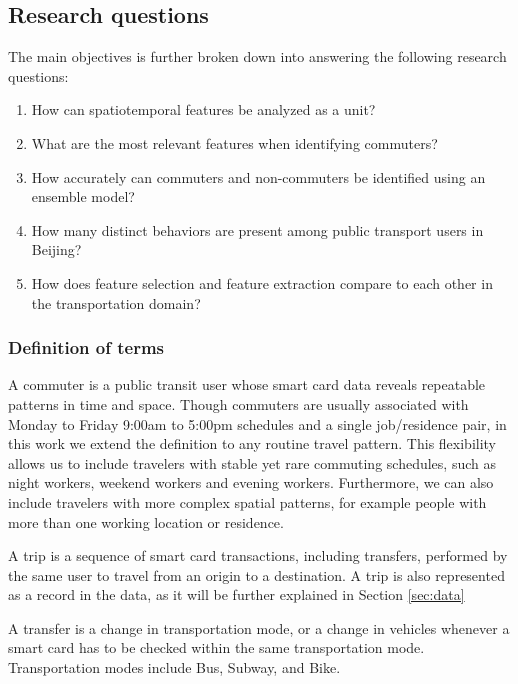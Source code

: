 \documentclass{article}
\begin{document}
\subsection{Research questions}
The main objectives is further broken down into answering the following research questions: 

\begin{enumerate}

\item How can spatiotemporal features be analyzed as a unit?

\item What are the most relevant features when identifying commuters?

\item How accurately can commuters and non-commuters be identified using an ensemble model? 

\item How many distinct behaviors are present among public transport users in Beijing?

\item How does feature selection and feature extraction compare to each other in the transportation domain?

\end{enumerate}

\subsubsection{Definition of terms}
A commuter is a public transit user whose smart card data reveals repeatable patterns in time and space. Though commuters are usually associated with Monday to Friday 9:00am to 5:00pm schedules and a single job/residence pair, in this work we extend the definition to any routine travel pattern. This flexibility allows us to include travelers with stable yet rare commuting schedules, such as night workers, weekend workers and evening workers. Furthermore, we can also include travelers with more complex spatial patterns, for example people with more than one working location or residence.  

A trip is a sequence of smart card transactions, including transfers, performed by the same user to travel from an origin to a destination. A trip is also represented as a record in the data, as it will be further explained in Section \ref{sec:data}

A transfer is a change in transportation mode, or a change in vehicles whenever a smart card has to be checked within the same transportation mode. Transportation modes include Bus, Subway, and Bike. 
\end{document}
